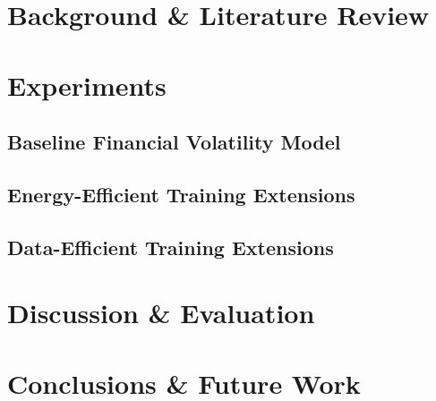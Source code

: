 \documentclass[a4paper, 11pt]{report}
\begin{document}
    \newpage
    \chapter{Background \& Literature Review}
    \label{chapter: literature}


    \newpage
    \chapter{Experiments}
    \label{chapter: experiments}

    \section{Baseline Financial Volatility Model}
    \label{section: baseline}

    \section{Energy-Efficient Training Extensions}
    \label{section: energy-extensions}

    \section{Data-Efficient Training Extensions}
    \label{section: data-extensions}


    \newpage
    \chapter{Discussion \& Evaluation}
    \label{chapter: evaluation}

    \newpage
    \chapter{Conclusions \& Future Work}
    \label{chapter: conclusion}


    \newpage
    
\end{document}
